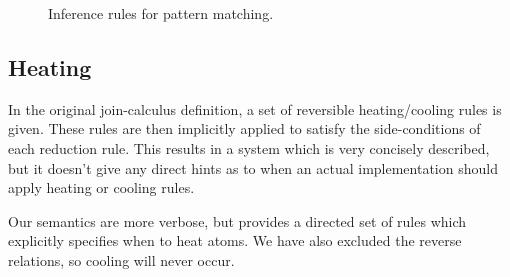 \begin{figure}[!h]
\caption{Inference rules for pattern matching.} \label{fig:rule:pat}
\end{figure}

\subsection{Heating}
In the original join-calculus definition, a set of reversible heating/cooling
rules is given. These rules are then implicitly applied to satisfy the
side-conditions of each reduction rule. This results in a system which is very
concisely described, but it doesn't give any direct hints as to when an actual
implementation should apply heating or cooling rules.

Our semantics are more verbose, but provides a directed set of rules which
explicitly specifies when to heat atoms. We have also excluded the reverse
relations, so cooling will never occur.

